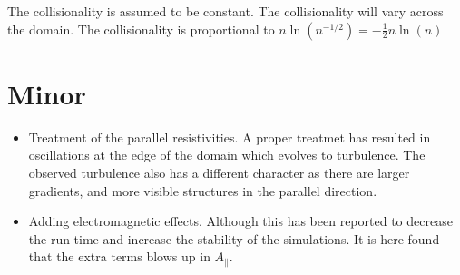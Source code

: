 The collisionality is assumed to be constant. The collisionality will
        vary across the domain. The collisionality is proportional to
        $n\ln(n^{-1/2})=-\frac{1}{2}n\ln(n)$



\section{Minor}

\begin{itemize}[noitemsep,nolistsep]
    \item Treatment of the parallel resistivities. A proper treatmet has
        resulted in oscillations at the edge of the domain which evolves to
        turbulence. The observed turbulence also has a different character as
        there are larger gradients, and more visible structures in the parallel
        direction.
    \item Adding electromagnetic effects. Although this has been reported to
        decrease the run time and increase the stability of the simulations. It
        is here found that the extra terms blows up in $A_\|$.
\end{itemize}
